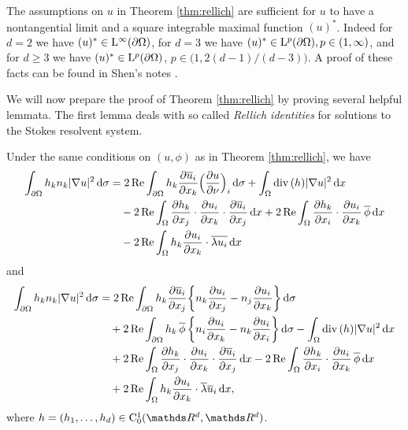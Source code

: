 \begin{rem}
  \label{rem:shenNontangential}
  The assumptions on $u$ in Theorem \ref{thm:rellich} are sufficient for $u$ to have a nontangential limit and a square integrable maximal function $(u)^*$. 
  Indeed for $d = 2$ we have $(u)^* \in \mathrm{L}^\infty(\partial\Omega)$, for $d = 3$ we have $(u)^* \in \mathrm{L}^p(\partial\Omega), p \in (1,\infty)$, and for $d \geq 3$ we have $(u)^* \in \mathrm{L}^p(\partial\Omega)$, $p \in \big(1, 2 (d - 1) / (d - 3) \big)$.
  A proof of these facts can be found in Shen's notes \cite[Prop. 7.1.3]{Shen2017}.
\end{rem}

We will now prepare the proof of Theorem \ref{thm:rellich} by proving several helpful lemmata.
The first lemma deals with so called \emph{Rellich identities} for solutions to the Stokes resolvent system.

\begin{lem}
  \label{lem:rellichIdentity}
  Under the same conditions on $(u,\phi)$ as in Theorem \ref{thm:rellich}, we have
  \begin{align}
    \int_{\partial\Omega} h_k n_k |\nabla u|^2 \, {\operatorname{d}\!{\sigma}} 
    &= 2 \operatorname{Re} \int_{\partial\Omega} h_k \frac{\partial \overline u_i}{\partial x_k} \Big( \frac{\partial u}{\partial \nu} \Big)_i \, {\operatorname{d}\!{\sigma}} + \int_\Omega \mathrm{div\,} (h) |\nabla u|^2 \, {\operatorname{d}\!{x}} \nonumber\\
    &\quad - 2 \operatorname{Re} \int_\Omega \frac{\partial h_k}{\partial x_j} \cdot \frac{\partial u_i}{\partial x_k} \cdot \frac{\partial \overline u_i}{\partial x_j} \, {\operatorname{d}\!{x}} + 2 \operatorname{Re} \int_\Omega \frac{\partial h_k}{\partial x_i} \cdot \frac{\partial u_i}{\partial x_k} \, \overline \phi \, {\operatorname{d}\!{x}} \nonumber\\
    &\quad - 2 \operatorname{Re} \int_\Omega h_k \frac{\partial u_i}{\partial x_k} \cdot \overline {\lambda u_i} \, {\operatorname{d}\!{x}} \label{eq:rellichIdentity}
  \end{align}
  and
  \begin{align}
    \int_{\partial\Omega} h_k n_k |\nabla u|^2 \, {\operatorname{d}\!{\sigma}}
    &= 2\operatorname{Re} \int_{\partial\Omega} h_k \frac{\partial \overline u_i}{\partial x_j} \bigg\{ n_k \frac{\partial u_i}{\partial x_j} - n_j \frac{\partial u_i}{\partial x_k} \bigg\} \, {\operatorname{d}\!{\sigma}} \nonumber\\
    &\quad + 2 \operatorname{Re} \int_{\partial\Omega} h_k \, \overline \phi \, \bigg\{ n_i \frac{\partial u_i}{\partial x_k} - n_k \frac{\partial u_i}{\partial x_i} \bigg\} \, {\operatorname{d}\!{\sigma}} - \int_\Omega \mathrm{div\,} (h) |\nabla u|^2 \, {\operatorname{d}\!{x}} \nonumber\\
    &\quad + 2 \operatorname{Re} \int_\Omega \frac{\partial h_k}{\partial x_j} \cdot \frac{\partial u_i}{\partial x_k} \cdot \frac{\partial \overline u_i}{\partial x_j} \, {\operatorname{d}\!{x}} - 2 \operatorname{Re} \int_\Omega \frac{\partial h_k}{\partial x_i} \cdot \frac{\partial u_i}{\partial x_k} \, \overline \phi \, {\operatorname{d}\!{x}} \nonumber\\
    &\quad + 2 \operatorname{Re} \int_\Omega h_k \frac{\partial u_i}{\partial x_k} \cdot \overline \lambda \overline u_i \, {\operatorname{d}\!{x}}, \label{eq:rellichIdentity2}
  \end{align}
  where $h = (h_1, \dots,h_d) \in \CC_0^1(\R^d, \R^d)$.
\end{lem}

